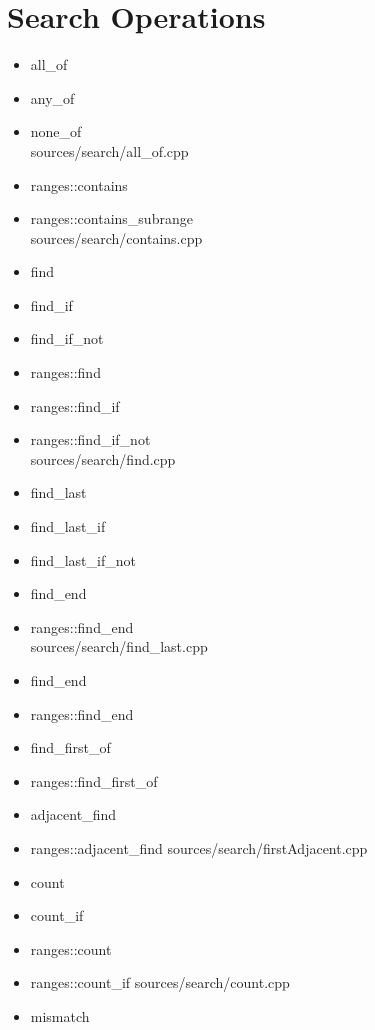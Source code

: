 \documentclass{article}
\begin{document}
\section{Search Operations}
    \begin{itemize}
      \item all\_of
      \item any\_of
      \item none\_of \\
         {sources/search/all_of.cpp}
      \item ranges::contains
      \item ranges::contains\_subrange \\
         {sources/search/contains.cpp}
      \item find
      \item find\_if
      \item find\_if\_not
      \item ranges::find
      \item ranges::find\_if
      \item ranges::find\_if\_not \\
         {sources/search/find.cpp}
      \item find\_last
      \item find\_last\_if
      \item find\_last\_if\_not
      \item find\_end
      \item ranges::find\_end \\
         {sources/search/find_last.cpp}
      \item find\_end
      \item ranges::find\_end
      \item find\_first\_of
      \item ranges::find\_first\_of
      \item adjacent\_find
      \item ranges::adjacent\_find
         {sources/search/firstAdjacent.cpp}
      \item count
      \item count\_if
      \item ranges::count
      \item ranges::count\_if
         {sources/search/count.cpp}
      \item mismatch

\end{itemize}
\end{document}
